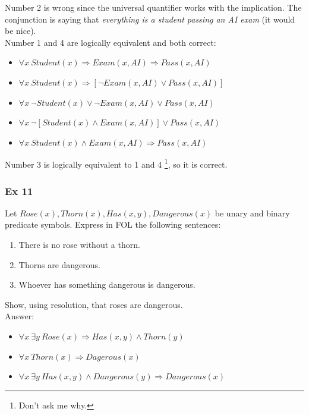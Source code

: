 \documentclass[10pt,a4paper]{article}
\begin{document}
Number 2 is wrong since the universal quantifier works with the implication. The conjunction is saying that \textit{everything is a student passing an AI exam} (it would be nice).\\
Number 1 and 4 are logically equivalent and both correct:
\begin{itemize}
\item $\forall x\ Student(x)\Rightarrow Exam(x, AI)\Rightarrow Pass(x,AI)$
\item $\forall x\ Student(x)\Rightarrow [\neg Exam(x, AI)\vee Pass(x,AI)]$
\item $\forall x\ \neg Student(x)\vee \neg Exam(x, AI)\vee Pass(x,AI)$
\item $\forall x\ \neg [Student(x)\wedge  Exam(x, AI)]\vee Pass(x,AI)$
\item $\forall x\ Student(x)\wedge  Exam(x, AI)\Rightarrow Pass(x,AI)$
\end{itemize} 
Number 3 is logically equivalent to 1 and 4 \footnote{Don't ask me why.}, so it is correct.


\subsubsection{Ex 11}
Let $Rose(x),Thorn(x), Has(x, y), Dangerous(x)$ be unary and binary predicate symbols. Express in FOL the following sentences:
\begin{enumerate}
\item There is no rose without a thorn.
\item Thorns are dangerous.
\item Whoever has something dangerous is dangerous.
\end{enumerate}
Show, using resolution, that roses are dangerous.\\

Answer:
\begin{itemize}
\item $\forall x\ \exists y \ Rose(x) \Rightarrow Has(x,y)\wedge Thorn(y)$
\item $\forall x\ Thorn(x) \Rightarrow Dagerous(x)$
\item $\forall x\ \exists y\ Has(x,y)\wedge Dangerous(y) \Rightarrow Dangerous(x)$
\end{itemize}
\end{document}
